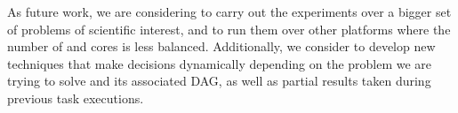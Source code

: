 As future work, we are considering to carry out the experiments over a bigger
set of problems of scientific interest, and to run them over other
platforms where the number of \BIG and \LITTLE cores is less
balanced. Additionally, we consider to develop new techniques that make
decisions dynamically depending on the problem we are trying to solve and
its associated DAG, as well as partial results taken during previous task
executions.





